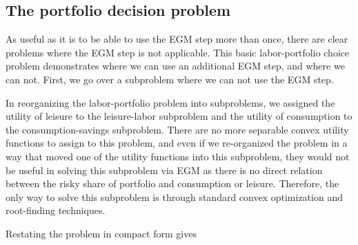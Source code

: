 \documentclass[\econtexRoot/SequentialEGM]{subfiles}
\begin{document}
%

\subsection{The portfolio decision problem}

As useful as it is to be able to use the EGM step more than once, there are clear problems where the EGM step is not applicable. This basic labor-portfolio choice problem demonstrates where we can use an additional EGM step, and where we can not. First, we go over a subproblem where we can not use the EGM step.

In reorganizing the labor-portfolio problem into subproblems, we assigned the utility of leisure to the leisure-labor subproblem and the utility of consumption to the consumption-savings subproblem. There are no more separable convex utility functions to assign to this problem, and even if we re-organized the problem in a way that moved one of the utility functions into this subproblem, they would not be useful in solving this subproblem via EGM as there is no direct relation between the risky share of portfolio and consumption or leisure. Therefore, the only way to solve this subproblem is through standard convex optimization and root-finding techniques.

Restating the problem in compact form gives
\end{document}
